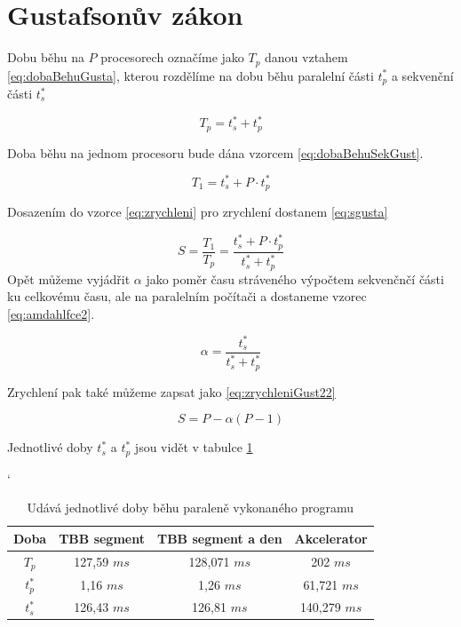 \documentclass{article}
\begin{document}
	\section{Gustafsonův zákon}
	Dobu běhu na $P$ procesorech označíme jako $T_{p}$ danou vztahem \ref{eq:dobaBehuGusta}, kterou rozdělíme na dobu běhu paralelní části  $t_{p}^{*}$ a sekvenční části  $t_{s}^{*}$
	
	\begin{equation} 
	T_{p} = t_{s}^{*} + t_{p}^{*} 
	\label{eq:dobaBehuGusta}
	\end{equation}
	
	Doba běhu na jednom procesoru bude dána vzorcem \ref{eq:dobaBehuSekGust}.
	
	\begin{equation} 
	T_{1} = t_{s}^{*} + P \cdot t_{p}^{*} 
	\label{eq:dobaBehuSekGust}
	\end{equation}
	
	Dosazením do vzorce \ref{eq:zrychleni} pro zrychlení dostanem \ref{eq:sgusta}
	
	
	\begin{equation} 
	S=\frac{T_{1}}{T_{p}} = \frac{t_{s}^{*} + P \cdot t_{p}^{*} }{t_{s}^{*} + t_{p}^{*}}
	\label{eq:sgusta}
	\end{equation}
	Opět můžeme vyjádřit $\alpha$ jako poměr času stráveného výpočtem sekvenčnčí části ku celkovému času, ale na paralelním počítači a  dostaneme vzorec \ref{eq:amdahlfce2}.
	
	\begin{equation} 
	\alpha = \frac{t_{s}^{*}}{t_{s}^{*} + t_{p}^{*}}
	\label{eq:amdahlfce2}
	\end{equation}
	
	Zrychlení pak také můžeme zapsat jako \ref{eq:zrychleniGust22}
	
	\begin{equation} 
	S = P - \alpha(P-1)
	\label{eq:zrychleniGust22}
	\end{equation}
	
	Jednotlivé doby $t_{s}^{*}$ a $t_{p}^{*}$ jsou vidět v tabulce \ref{tab:doby3}
	
	\begin{table}[h]
	\centering
	\catcode`
	\def\arraystretch{1.2}
	\begin{tabular}{|c|c|c|c|}
	\hline
	\textbf{Doba}   & \textbf{TBB segment} & \textbf{TBB segment a den} &  \textbf{Akcelerator} \\ \hline
	\hline
	$T_{p}$    		  & 127,59 $m s$                  & 128,071 $m s$     		  &        202  $m s$                     \\ \hline
	$t_{p}^{*}$                  & 1,16 $m s$                  & 1,26 $m s$               &       61,721 $m s$                         \\ \hline
	$t_{s}^{*}$           		  & 126,43 $m s$                  & 126,81 $m s$                       & 140,279   $m s$          \\ \hline
	\end{tabular}
	\caption{Udává jednotlivé doby běhu paraleně vykonaného programu}
	\label{tab:doby3}
	\end{table}
	
\end{document}
